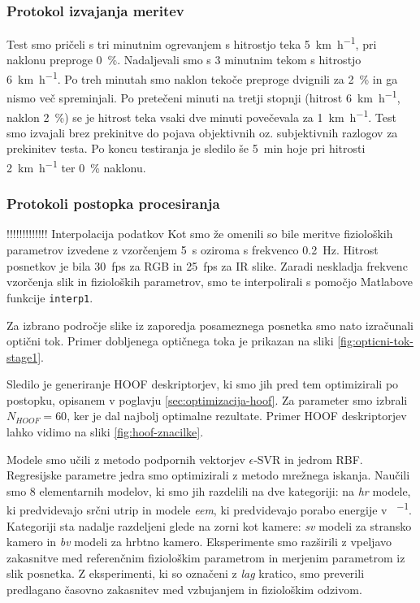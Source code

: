 \subsubsection{Protokol izvajanja meritev}
Test smo pričeli s tri minutnim ogrevanjem s hitrostjo teka \SI{5}{\km\per\hour}, pri naklonu preproge \SI{0}{\%}. Nadaljevali smo s 3 minutnim tekom s hitrostjo \SI{6}{\km\per\hour}. Po treh minutah smo naklon tekoče preproge  dvignili za \SI{2}{\%} in ga nismo več spreminjali. Po pretečeni minuti na  tretji stopnji (hitrost \SI{6}{\km\per\hour}, naklon \SI{2}{\%}) se je hitrost teka vsaki dve  minuti  povečevala za \SI{1}{\km\per\hour}. Test smo izvajali brez prekinitve do pojava objektivnih oz. subjektivnih razlogov za prekinitev testa. Po koncu testiranja je sledilo še \SI{5}{min} hoje pri  hitrosti \SI{2}{\km\per\hour} ter \SI{0}{\%} naklonu.  

\subsubsection{Protokoli postopka procesiranja}
!!!!!!!!!!!!!
Interpolacija podatkov
Kot smo že omenili so bile meritve fizioloških parametrov izvedene z vzorčenjem \SI{5}{\s} oziroma s frekvenco \SI{0.2}{\hertz}. Hitrost posnetkov je bila \SI{30}{fps} za RGB in \SI{25}{fps} za IR slike. Zaradi neskladja frekvenc vzorčenja slik in fizioloških parametrov, smo te interpolirali s pomočjo Matlabove funkcije \texttt{interp1}.

Za izbrano področje slike iz zaporedja posameznega posnetka smo nato izračunali optični tok. Primer dobljenega optičnega toka je prikazan na sliki \ref{fig:opticni-tok-stage1}.

Sledilo je generiranje HOOF deskriptorjev, ki smo jih pred tem optimizirali po postopku, opisanem v poglavju \ref{sec:optimizacija-hoof}. Za parameter smo izbrali $N_{HOOF} = 60 $, ker je dal najbolj optimalne rezultate. Primer HOOF deskriptorjev lahko vidimo na sliki \ref{fig:hoof-znacilke}.

Modele smo učili z metodo podpornih vektorjev $\epsilon$-SVR in jedrom RBF. Regresijske parametre jedra smo optimizirali z metodo mrežnega iskanja. Naučili smo \num{8} elementarnih modelov, ki smo jih razdelili na dve kategoriji: na \textit{hr} modele, ki predvidevajo srčni utrip in modele \textit{eem}, ki predvidevajo porabo energije v \si{\kcal\per\min}. Kategoriji sta nadalje razdeljeni glede na zorni kot kamere: \textit{sv} modeli za stransko kamero in \textit{bv} modeli za hrbtno kamero. Eksperimente smo razširili z vpeljavo zakasnitve med referenčnim fiziološkim parametrom in merjenim parametrom iz slik posnetka. Z eksperimenti, ki so označeni z \textit{lag} kratico, smo preverili predlagano časovno zakasnitev med vzbujanjem in fiziološkim odzivom. 


